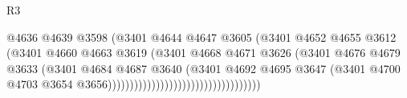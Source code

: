\begin{lexlean}{R3}
\begin{coremodule}
                                                          @4636
                                                          @4639
                                                          @3598
                                                          (@3401
                                                            @4644
                                                            @4647
                                                            @3605
                                                            (@3401
                                                              @4652
                                                              @4655
                                                              @3612
                                                              (@3401
                                                                @4660
                                                                @4663
                                                                @3619
                                                                (@3401
                                                                  @4668
                                                                  @4671
                                                                  @3626
                                                                  (@3401
                                                                    @4676
                                                                    @4679
                                                                    @3633
                                                                    (@3401
                                                                      @4684
                                                                      @4687
                                                                      @3640
                                                                      (@3401
                                                                        @4692
                                                                        @4695
                                                                        @3647
                                                                        (@3401
                                                                          @4700
                                                                          @4703
                                                                          @3654
                                                                          @3656)))))))))))))))))))))))))))))))))))

\end{coremodule}
\end{lexlean}

